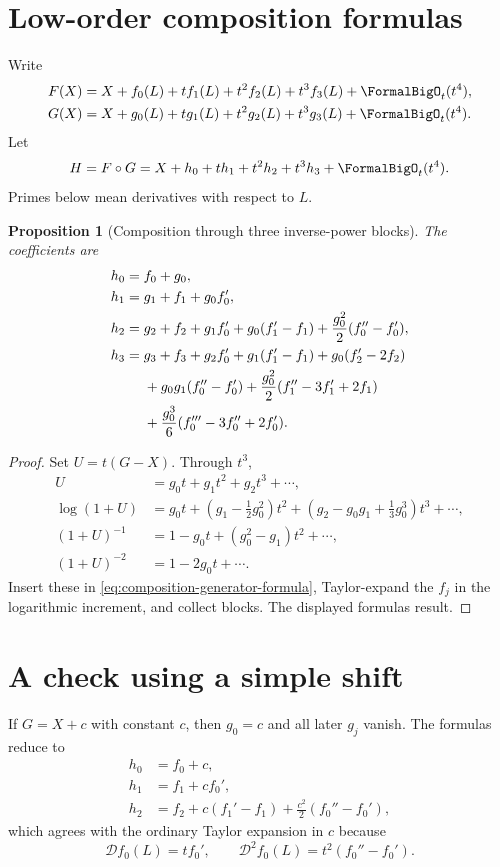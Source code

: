 \documentclass[11pt,oneside]{book}
\newtheorem{proposition}[theorem]{Proposition}
\theoremstyle{definition}
\theoremstyle{remark}
\newcommand{\D}{\mathcal D}
\newcommand{\compose}{\mathbin{\circ}}
\begin{document}
\section{Low-order composition formulas}
Write
\begin{align}\label{eq:F-G-coeff-notation}
 F(X)&=X+f_0(L)+t f_1(L)+t^2f_2(L)+t^3f_3(L)+\FormalBigO_t(t^4),\\
 G(X)&=X+g_0(L)+t g_1(L)+t^2g_2(L)+t^3g_3(L)+\FormalBigO_t(t^4).
\end{align}
Let
\[
 H=F\compose G
 =X+h_0+t h_1+t^2h_2+t^3h_3+\FormalBigO_t(t^4).
\]
Primes below mean derivatives with respect to $L$.

\begin{proposition}[Composition through three inverse-power blocks]
\label{prop:composition-first-blocks}
The coefficients are
\begin{align}
 h_0={}&f_0+g_0,\label{eq:h0}\\
 h_1={}&g_1+f_1+g_0f_0',\label{eq:h1}\\
 h_2={}&g_2+f_2+g_1f_0'
 +g_0(f_1'-f_1)
 +\frac{g_0^2}{2}(f_0''-f_0'),\label{eq:h2}\\
 h_3={}&g_3+f_3+g_2f_0'
 +g_1(f_1'-f_1)+g_0(f_2'-2f_2)\notag\\
 &+g_0g_1(f_0''-f_0')
 +\frac{g_0^2}{2}(f_1''-3f_1'+2f_1)\notag\\
 &+\frac{g_0^3}{6}(f_0'''-3f_0''+2f_0').
 \label{eq:h3}
\end{align}
\end{proposition}
\begin{proof}
Set $U=t(G-X)$.  Through $t^3$,
\begin{align*}
 U&=g_0t+g_1t^2+g_2t^3+\cdots,\\
 \log(1+U)
 &=g_0t+\left(g_1-\frac12g_0^2\right)t^2
 +\left(g_2-g_0g_1+\frac13g_0^3\right)t^3+\cdots,\\
 (1+U)^{-1}
 &=1-g_0t+(g_0^2-g_1)t^2+\cdots,\\
 (1+U)^{-2}
 &=1-2g_0t+\cdots.
\end{align*}
Insert these in \eqref{eq:composition-generator-formula}, Taylor-expand the
$f_j$ in the logarithmic increment, and collect blocks.  The displayed
formulas result.
\end{proof}

\section{A check using a simple shift}
If $G=X+c$ with constant $c$, then $g_0=c$ and all later $g_j$ vanish.  The
formulas reduce to
\begin{align*}
 h_0&=f_0+c,\\
 h_1&=f_1+cf_0',\\
 h_2&=f_2+c(f_1'-f_1)+\frac{c^2}{2}(f_0''-f_0'),
\end{align*}
which agrees with the ordinary Taylor expansion in $c$ because
\[
 \D f_0(L)=tf_0',
 \qquad
 \D^2 f_0(L)=t^2(f_0''-f_0').
\]
\end{document}
